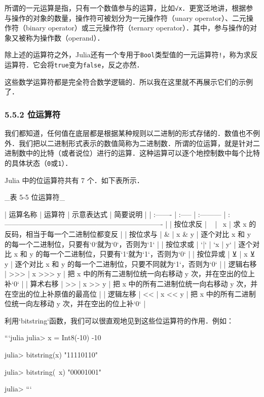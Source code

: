 所谓的一元运算是指，只有一个数值参与的运算，比如\verb|√x|．更宽泛地讲，根据参与操作的对象的数量，操作符可被划分为一元操作符（unary operator）、二元操作符（binary operator）或三元操作符（ternary operator）．其中，参与操作的对象又被称为操作数（operand）．

除上述的运算符之外，Julia还有一个专用于\verb|Bool|类型值的一元运算符\verb|!|，称为求反运算符．它会将\verb|true|变为\verb|false|，反之亦然．

这些数学运算符都是完全符合数学逻辑的．所以我在这里就不再展示它们的示例了．

\subsubsection{5.5.2 位运算符}

我们都知道，任何值在底层都是根据某种规则以二进制的形式存储的．数值也不例外．我们把以二进制形式表示的数值简称为二进制数．所谓的位运算，就是针对二进制数中的比特（或者说位）进行的运算．这种运算可以逐个地控制数中每个比特的具体状态（\verb|0|或\verb|1|）．

Julia 中的位运算符共有 7 个．如下表所示．

_表 5-5 位运算符_

| 运算名称 | 运算符 | 示意表达式 | 简要说明                                                             |
| :------- | :----- | :--------- | :------------------------------------------------------------------- |
| 按位求反 | ~      | ~x         | 求 x 的反码，相当于每一个二进制位都变反                              |
| 按位求与 | &      | x & y      | 逐个对比 x 和 y 的每一个二进制位，只要有`0`就为`0`，否则为`1`        |
| 按位求或 | `|`    | `x | y`    | 逐个对比 x 和 y 的每一个二进制位，只要有`1`就为`1`，否则为`0`        |
| 按位异或 | ⊻      | x ⊻ y      | 逐个对比 x 和 y 的每一个二进制位，只要不同就为`1`，否则为`0`         |
| 逻辑右移 | >>>    | x >>> y    | 把 x 中的所有二进制位统一向右移动 y 次，并在空出的位上补`0`          |
| 算术右移 | >>     | x >> y     | 把 x 中的所有二进制位统一向右移动 y 次，并在空出的位上补原值的最高位 |
| 逻辑左移 | <<     | x << y     | 把 x 中的所有二进制位统一向左移动 y 次，并在空出的位上补`0`          |

利用`bitstring`函数，我们可以很直观地见到这些位运算符的作用．例如：

```julia
julia> x = Int8(-10)
-10

julia> bitstring(x)
"11110110"

julia> bitstring(~x)
"00001001"

julia> 
```


